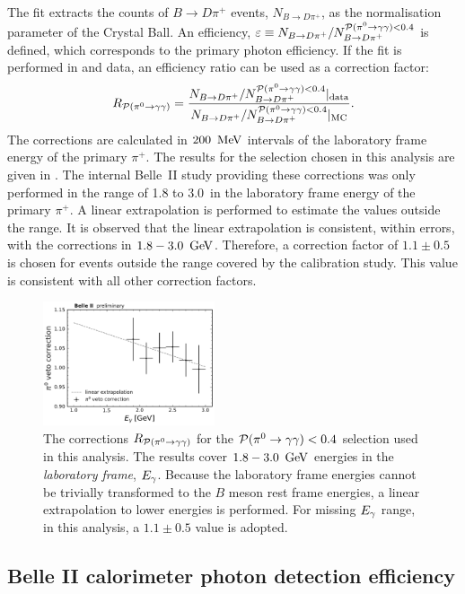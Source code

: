 The fit extracts the counts of $B\to D\pi^+$ events, $N_{B\to D\pi^+}$, as the normalisation parameter of the Crystal Ball.
An efficiency, $\varepsilon\equiv N_{B\rightarrow D\pi^+}/N^{{\mathcal{P}(\pi^0\rightarrow\gamma\gamma)}<0.4}_{B\rightarrow D\pi^+}$ is defined, which corresponds to the primary photon efficiency.
If the fit is performed in \MC and data, an efficiency ratio can be used as a correction factor:
\begin{equation}\label{eq:piveto_correction}
    R_{{\mathcal{P}(\pi^0\rightarrow\gamma\gamma)}} = \frac{N_{B\rightarrow D\pi^+}/N^{{\mathcal{P}(\pi^0\rightarrow\gamma\gamma)}<0.4}_{B\rightarrow D\pi^+}|_{\mathrm{data}}}{N_{B\rightarrow D\pi^+}/N^{{\mathcal{P}(\pi^0\rightarrow\gamma\gamma)}<0.4}_{B\rightarrow D\pi^+}|_{\mathrm{MC}}}.
\end{equation}
The corrections are calculated in $200~\mathrm{\,Me\kern -0.1em V}$ intervals of the laboratory frame energy of the primary $\pi^+$.
The results for the selection chosen in this analysis are given in .
The internal Belle~II study providing these corrections was only performed in the range of 1.8 to 3.0~\gev in the laboratory frame energy of the primary $\pi^+$.
A linear extrapolation is performed to estimate the values outside the range.
It is observed that the linear extrapolation is consistent, within errors, with the corrections in $1.8-3.0~\mathrm{\,Ge\kern -0.1em V}$.
Therefore, a correction factor of $1.1\pm0.5$ is chosen for events outside the range covered by the calibration study.
This value is consistent with all other correction factors.
\begin{figure}[htbp!]
    \centering
    \includegraphics[width=0.45\textwidth]{figures/data_sim_corrections/pi0veto_corrections.pdf}
    \caption{\label{fig:piveto_corrections} The corrections $R_{{\mathcal{P}(\pi^0\rightarrow\gamma\gamma)}}$ for the ${\mathcal{P}(\pi^0\rightarrow\gamma\gamma)}<0.4$ selection used in this analysis.
    The results cover $1.8-3.0~\mathrm{\,Ge\kern -0.1em V}$ energies in the \textit{laboratory frame}, ${E_{\gamma}}$.
    Because the laboratory frame energies cannot be trivially transformed to the $B$ meson rest frame energies, a linear extrapolation to lower energies is performed.
    For missing ${E_{\gamma}}$ range, in this analysis, a $1.1\pm0.5$ value is adopted.
    }
\end{figure}

\subsection{Belle II calorimeter photon detection efficiency}\label{sec:photon_efficiency}

